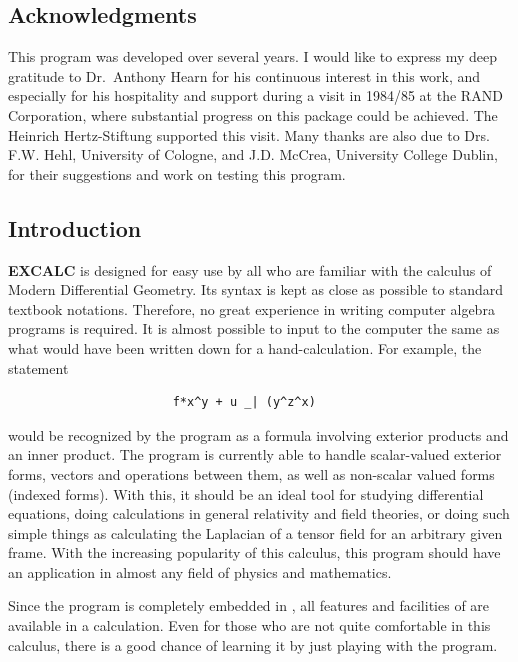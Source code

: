 

\setcounter{examplectr}{0}

\subsection*{Acknowledgments}

This program was developed over several years. I would like to express
my deep gratitude to Dr.\ Anthony Hearn for his continuous interest in
this work, and especially for his hospitality and support during a
visit in 1984/85 at the RAND Corporation, where substantial progress
on this package could be achieved. The Heinrich Hertz-Stiftung
supported this visit. Many thanks are also due to Drs. F.W. Hehl,
University of Cologne, and J.D. McCrea, University College Dublin, for
their suggestions and work on testing this program.

\subsection{Introduction}

\textbf{EXCALC} is designed for easy use by all who are familiar with the
calculus of Modern Differential Geometry.  Its syntax is kept as close
as possible to standard textbook notations.  Therefore, no great
experience in writing computer algebra programs is required.  It is
almost possible to input to the computer the same as what would have
been written down for a hand-calculation.  For example, the statement
\begin{verbatim}
                       f*x^y + u _| (y^z^x)
\end{verbatim}
would be recognized by the program as a formula involving exterior
products and an inner product.  The program is currently able to
handle scalar-valued exterior forms, vectors and operations between
them, as well as non-scalar valued forms (indexed forms).  With this,
it should be an ideal tool for studying differential equations,
doing calculations in general relativity and field theories, or doing
such simple things as calculating the Laplacian of a tensor field for
an arbitrary given frame.  With the increasing popularity of this
calculus, this program should have an application in almost any field
of physics and mathematics.

Since the program is completely embedded in {\REDUCE}, all features and
facilities of {\REDUCE} are available in a calculation.  Even for those
who are not quite comfortable in this calculus, there is a good chance
of learning it by just playing with the program.

